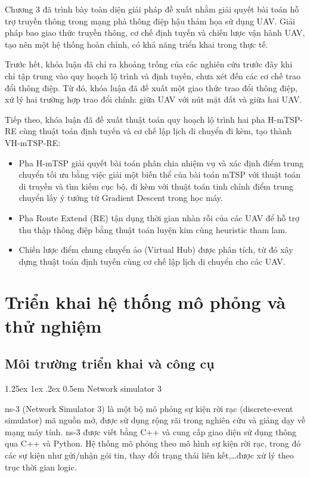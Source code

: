 \documentclass[a4paper]{article}
\makeatletter
\renewcommand{\paragraph}{%
  \@startsection{paragraph}{4}{\z@}%
  {1.25ex \@plus 1ex \@minus .2ex}%
  {0.5em}%
  {\normalfont\normalsize\bfseries}%
}
\makeatother
\begin{document}
Chương 3 đã trình bày toàn diện giải pháp đề xuất nhằm giải quyết bài toán hỗ trợ truyền thông trong mạng phà thông điệp hậu thảm họa sử dụng UAV. Giải pháp bao giao thức truyền thông, cơ chế định tuyến và chiến lược vận hành UAV, tạo nên một hệ thống hoàn chỉnh, có khả năng triển khai trong thực tế.

Trước hết, khóa luận đã chỉ ra khoảng trống của các nghiên cứu trước đây khi chỉ tập trung vào quy hoạch lộ trình và định tuyến, chưa xét đến các cơ chế trao đổi thông điệp. Từ đó, khóa luận đã đề xuất một giao thức trao đổi thông điệp, xứ lý hai trường hợp trao đổi chính: giữa UAV với nút mặt đất và giữa hai UAV.

Tiếp theo, khóa luận đã đề xuất thuật toán quy hoạch lộ trình hai pha H-mTSP-RE cùng thuật toán định tuyến và cơ chế lập lịch di chuyển đi kèm, tạo thành VH-mTSP-RE:
\begin{itemize}
  \item Pha H-mTSP giải quyết bài toán phân chia nhiệm vụ và xác định điểm trung chuyển tối ưu bằng việc giải một biến thể của bài toán mTSP với thuật toán di truyền và tìm kiếm cục bộ, đi kèm với thuật toán tinh chỉnh điểm trung chuyển lấy ý tưởng từ Gradient Descent trong học máy.
  \item Pha Route Extend (RE) tận dụng thời gian nhàn rỗi của các UAV để hỗ trợ thu thập thông điệp bằng thuật toán luyện kim cùng heuristic tham lam.
  \item Chiến lược điểm chung chuyển ảo (Virtual Hub) được phân tích, từ đó xây dựng thuật toán định tuyến cùng cơ chế lập lịch di chuyển cho các UAV.
\end{itemize}

\section{Triển khai hệ thống mô phỏng và thử nghiệm}
\subsection{Môi trường triển khai và công cụ}
\paragraph{Network simulator 3}

ns-3 (Network Simulator 3) là một bộ mô phỏng sự kiện rời rạc (discrete-event simulator) mã nguồn mở, được sử dụng rộng rãi trong nghiên cứu và giảng dạy về mạng máy tính.
ns-3 được viết bằng C++ và cung cấp giao diện sử dụng thông qua C++ và Python. Hệ thống mô phỏng theo mô hình sự kiện rời rạc, trong đó các sự kiện như gửi/nhận gói tin, thay đổi trạng thái liên kết,\dots được xử lý theo trục thời gian logic.
\end{document}
